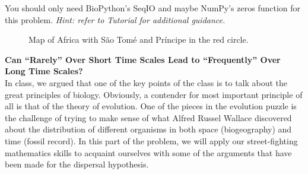 \documentclass[12pt]{article}    %
\begin{document}
You should only need BioPython's SeqIO and maybe NumPy's zeros function for this
problem. {\it Hint: refer to Tutorial for additional guidance.}\\

\begin{figure}[h!]
	\caption{Map of Africa with S\~ao Tom\'e and Pr\'incipe in the red circle.}
	\label{fig:africa}
\end{figure}

{\bf{Can ``Rarely'' Over Short Time Scales Lead to ``Frequently'' Over Long Time
Scales?}}\\

In class, we argued that one of the key points of the class is to talk about the
great principles of biology. Obviously, a contender for most important principle
of all is that of the theory of evolution. One of the pieces in the evolution
puzzle is the challenge of trying to make sense of what Alfred Russel Wallace
discovered about the distribution of different organisms in both space
(biogeography) and time (fossil record). In this part of the problem, we will
apply our street-fighting mathematics skills to acquaint ourselves with some of
the arguments that have been made for the dispersal hypothesis.\\
\end{document}
